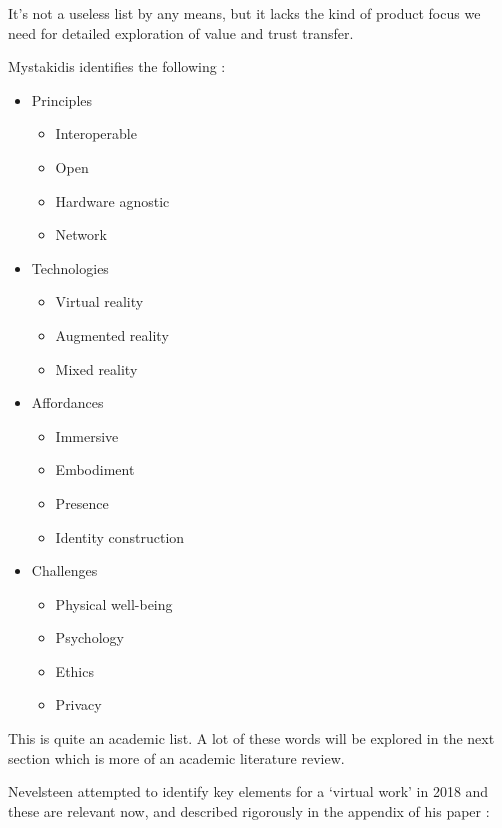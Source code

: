 It's not a useless list by any means, but it lacks the kind of product focus we need for detailed exploration of value and trust transfer. \par
Mystakidis identifies the following \cite{mystakidis2022metaverse}:
\begin{itemize}
\item Principles
\begin{itemize}
\item Interoperable
\item Open
\item Hardware agnostic
\item Network
\end{itemize}
\item Technologies
\begin{itemize}
\item Virtual reality
\item Augmented reality
\item Mixed reality
\end{itemize}
\item Affordances
\begin{itemize}
\item Immersive
\item Embodiment
\item Presence
\item Identity construction
\end{itemize}
\item Challenges
\begin{itemize}
\item Physical well-being
\item Psychology
\item Ethics
\item Privacy
\end{itemize}
\end{itemize}
This is quite an academic list. A lot of these words will be explored in the next section which is more of an academic literature review.\par
Nevelsteen attempted to identify key elements for a `virtual work' in 2018 and these are relevant now, and described rigorously in the appendix of his paper \cite{nevelsteen2018virtual}:
